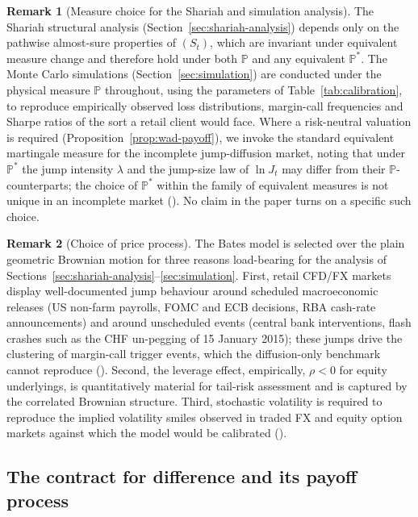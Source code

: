\documentclass[preprint,12pt,authoryear]{elsarticle}
\newcommand{\PP}{\mathbb{P}}
\theoremstyle{definition}
\newtheorem{remark}{Remark}[section]
\begin{document}
\begin{remark}[Measure choice for the Shariah and simulation analysis]
\label{rem:measure-choice}
The Shariah structural analysis (Section~\ref{sec:shariah-analysis})
depends only on the pathwise almost-sure properties of $(S_t)$, which
are invariant under equivalent measure change and therefore hold under
both $\PP$ and any equivalent $\PP^{*}$. The Monte Carlo simulations
(Section~\ref{sec:simulation}) are conducted under the physical measure
$\PP$ throughout, using the parameters of Table~\ref{tab:calibration},
to reproduce empirically observed loss distributions, margin-call
frequencies and Sharpe ratios of the sort a retail client would face.
Where a risk-neutral valuation is required
(Proposition~\ref{prop:wad-payoff}), we invoke the standard equivalent
martingale measure for the incomplete jump-diffusion market, noting
that under $\PP^{*}$ the jump intensity $\lambda$ and the jump-size
law of $\ln J_t$ may differ from their $\PP$-counterparts; the choice
of $\PP^{*}$ within the family of equivalent measures is not unique in
an incomplete market (\citealp{Cont2004}). No claim in the paper turns
on a specific such choice.
\end{remark}

\begin{remark}[Choice of price process]
\label{rem:model-choice}
The Bates model is selected over the plain \citet{BlackScholes1973}
geometric Brownian motion for three reasons load-bearing for the
analysis of Sections~\ref{sec:shariah-analysis}--\ref{sec:simulation}.
First, retail CFD/FX markets display well-documented jump behaviour
around scheduled macroeconomic releases (US non-farm payrolls, FOMC
and ECB decisions, RBA cash-rate announcements) and around unscheduled
events (central bank interventions, flash crashes such as the CHF
un-pegging of 15 January 2015); these jumps drive the clustering of
margin-call trigger events, which the diffusion-only benchmark cannot
reproduce (\citealp{Merton1976}). Second, the leverage effect,
empirically, $\rho < 0$ for equity underlyings, is quantitatively
material for tail-risk assessment and is captured by the correlated
Brownian structure. Third, stochastic volatility is required to
reproduce the implied volatility smiles observed in traded FX and
equity option markets against which the model would be calibrated
(\citealp{Heston1993,Bjork2009}).
\end{remark}

\subsection{The contract for difference and its payoff process}
\label{sec:cfd-payoff}
\end{document}
